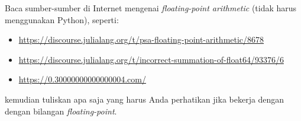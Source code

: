 \begin{soal}
Baca sumber-sumber di Internet mengenai \textit{floating-point arithmetic} (tidak
harus menggunakan Python), seperti:
\begin{itemize}
\item {\small\url{https://discourse.julialang.org/t/psa-floating-point-arithmetic/8678}}
\item {\small\url{https://discourse.julialang.org/t/incorrect-summation-of-float64/93376/6}}
\item {\small\url{https://0.30000000000000004.com/}}
\end{itemize}
kemudian tuliskan apa saja yang harus Anda perhatikan jika bekerja dengan
dengan bilangan \textit{floating-point}.
\end{soal}




